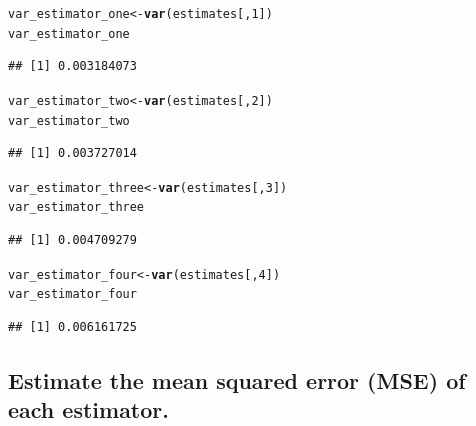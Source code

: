 \documentclass{article}\usepackage[]{graphicx}\usepackage[]{xcolor}
\makeatletter
\newcommand{\hlnum}[1]{\textcolor[rgb]{0.686,0.059,0.569}{#1}}%
\newcommand{\hlstd}[1]{\textcolor[rgb]{0.345,0.345,0.345}{#1}}%
\newcommand{\hlkwb}[1]{\textcolor[rgb]{0.69,0.353,0.396}{#1}}%
\newcommand{\hlkwd}[1]{\textcolor[rgb]{0.737,0.353,0.396}{\textbf{#1}}}%
\newenvironment{kframe}{%
 \def\at@end@of@kframe{}%
 \ifinner\ifhmode%
  \def\at@end@of@kframe{\end{minipage}}%
  \begin{minipage}{\columnwidth}%
 \fi\fi%
 \def\FrameCommand##1{\hskip\@totalleftmargin \hskip-\fboxsep
 \colorbox{shadecolor}{##1}\hskip-\fboxsep
     \hskip-\linewidth \hskip-\@totalleftmargin \hskip\columnwidth}%
 \MakeFramed {\advance\hsize-\width
   \@totalleftmargin\z@ \linewidth\hsize
   \@setminipage}}%
 {\par\unskip\endMakeFramed%
 \at@end@of@kframe}
\newenvironment{knitrout}{}{} %
\makeatother
\begin{document}
\begin{knitrout}
\color{fgcolor}\begin{kframe}
\begin{alltt}
\hlstd{var_estimator_one} \hlkwb{<-} \hlkwd{var}\hlstd{(estimates[,}\hlnum{1}\hlstd{])}
\hlstd{var_estimator_one}
\end{alltt}
\begin{verbatim}
## [1] 0.003184073
\end{verbatim}
\begin{alltt}
\hlstd{var_estimator_two} \hlkwb{<-} \hlkwd{var}\hlstd{(estimates[,}\hlnum{2}\hlstd{])}
\hlstd{var_estimator_two}
\end{alltt}
\begin{verbatim}
## [1] 0.003727014
\end{verbatim}
\begin{alltt}
\hlstd{var_estimator_three} \hlkwb{<-} \hlkwd{var}\hlstd{(estimates[,}\hlnum{3}\hlstd{])}
\hlstd{var_estimator_three}
\end{alltt}
\begin{verbatim}
## [1] 0.004709279
\end{verbatim}
\begin{alltt}
\hlstd{var_estimator_four} \hlkwb{<-} \hlkwd{var}\hlstd{(estimates[,}\hlnum{4}\hlstd{])}
\hlstd{var_estimator_four}
\end{alltt}
\begin{verbatim}
## [1] 0.006161725
\end{verbatim}
\end{kframe}
\end{knitrout}
  
  \subsection{Estimate the mean squared error (MSE) of each estimator.}
  
\end{document}
